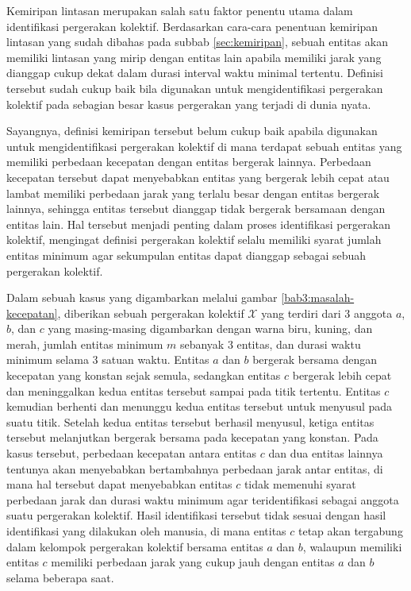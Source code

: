 Kemiripan lintasan merupakan salah satu faktor penentu utama dalam identifikasi pergerakan kolektif. Berdasarkan cara-cara penentuan kemiripan lintasan yang sudah dibahas pada subbab \ref{sec:kemiripan}, sebuah entitas akan memiliki lintasan yang mirip dengan entitas lain apabila memiliki jarak yang dianggap cukup dekat dalam durasi interval waktu minimal tertentu. Definisi tersebut sudah cukup baik bila digunakan untuk mengidentifikasi pergerakan kolektif pada sebagian besar kasus pergerakan yang terjadi di dunia nyata.

Sayangnya, definisi kemiripan tersebut belum cukup baik apabila digunakan untuk mengidentifikasi pergerakan kolektif di mana terdapat sebuah entitas yang memiliki perbedaan kecepatan dengan entitas bergerak lainnya. Perbedaan kecepatan tersebut dapat menyebabkan entitas yang bergerak lebih cepat atau lambat memiliki perbedaan jarak yang terlalu besar dengan entitas bergerak lainnya, sehingga entitas tersebut dianggap tidak bergerak bersamaan dengan entitas lain. Hal tersebut menjadi penting dalam proses identifikasi pergerakan kolektif, mengingat definisi pergerakan kolektif selalu memiliki syarat jumlah entitas minimum agar sekumpulan entitas dapat dianggap sebagai sebuah pergerakan kolektif.
    
Dalam sebuah kasus yang digambarkan melalui gambar \ref{bab3:masalah-kecepatan}, diberikan sebuah pergerakan kolektif $\mathcal{X}$ yang terdiri dari $3$ anggota $a$, $b$, dan $c$ yang masing-masing digambarkan dengan warna biru, kuning, dan merah, jumlah entitas minimum $m$ sebanyak $3$ entitas, dan durasi waktu minimum selama $3$ satuan waktu. Entitas $a$ dan $b$ bergerak bersama dengan kecepatan yang konstan sejak semula, sedangkan entitas $c$ bergerak lebih cepat dan meninggalkan kedua entitas tersebut sampai pada titik tertentu. Entitas $c$ kemudian berhenti dan menunggu kedua entitas tersebut untuk menyusul pada suatu titik. Setelah kedua entitas tersebut berhasil menyusul, ketiga entitas tersebut melanjutkan bergerak bersama pada kecepatan yang konstan. Pada kasus tersebut, perbedaan kecepatan antara entitas $c$ dan dua entitas lainnya tentunya akan menyebabkan bertambahnya perbedaan jarak antar entitas, di mana hal tersebut dapat menyebabkan entitas $c$ tidak memenuhi syarat perbedaan jarak dan durasi waktu minimum agar teridentifikasi sebagai anggota suatu pergerakan kolektif. Hasil identifikasi tersebut tidak sesuai dengan hasil identifikasi yang dilakukan oleh manusia, di mana entitas $c$ tetap akan tergabung dalam kelompok pergerakan kolektif bersama entitas $a$ dan $b$, walaupun memiliki entitas $c$ memiliki perbedaan jarak yang cukup jauh dengan entitas $a$ dan $b$ selama beberapa saat.

